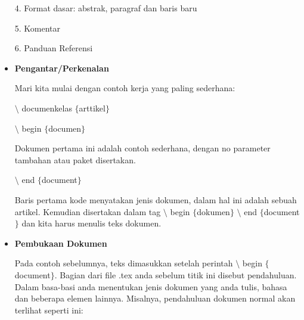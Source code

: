 \begin{itemize}
\hspace*{0.5in}4. Format dasar: abstrak, paragraf dan baris baru\par

\hspace*{0.5in}5. Komentar\par

\hspace*{0.5in}6. Panduan Referensi\par

\vspace{10pt}

	\item {\fontsize{14pt}{14pt}\selectfont \textbf{Pengantar/Perkenalan}}\par

Mari kita mulai dengan contoh kerja yang paling sederhana:\par

\hspace*{0.5in}$\setminus$ documenkelas $ \{ $arttikel$ \} $\par

\hspace*{0.5in}$\setminus$ begin $ \{ $documen$ \} $\par

\hspace*{0.5in}Dokumen pertama ini adalah contoh sederhana, dengan no parameter tambahan atau paket \hspace*{0.5in}disertakan.\par

\hspace*{0.5in}$\setminus$ end $ \{ $document$ \} $\par

Baris pertama kode menyatakan jenis dokumen, dalam hal ini adalah sebuah artikel. Kemudian disertakan dalam tag $\setminus$ begin $ \{ $dokumen$ \} $ $\setminus$ end $ \{ $document$ \} $ dan kita harus menulis teks dokumen.\par

\vspace{10pt}
	\item {\fontsize{14pt}{14pt}\selectfont \textbf{Pembukaan Dokumen}}\par

Pada contoh sebelumnya, teks dimasukkan setelah perintah $\setminus$ begin $ \{ $document$ \} $. Bagian dari file .tex anda sebelum titik ini disebut pendahuluan. Dalam basa-basi anda menentukan jenis dokumen yang anda tulis, bahasa dan beberapa elemen lainnya. Misalnya, pendahuluan dokumen normal akan terlihat seperti ini:\par


\end{itemize}
